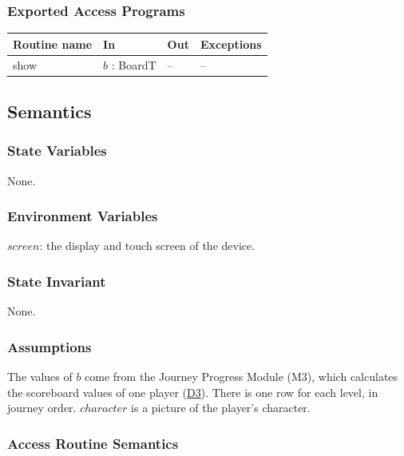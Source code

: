 \documentclass[10pt, titlepage]{article}
\newcommand{\srsurl}{https://team-hindsight.github.io/ophthamology-game/SRS/SRS.pdf}
\newcommand{\srsitemref}[2]{\href{\srsurl\#nameddest=#1}{#2}}
\newcommand{\T}[1]{\mathit{#1}}          %
\newenvironment{accessprogs}{%
  \begin{center}\small
  \begin{tabular}{>{\raggedright\arraybackslash}p{3.0cm}
    >{\raggedright\arraybackslash}p{5.0cm}
    >{\raggedright\arraybackslash}p{2.8cm}
    >{\raggedright\arraybackslash}p{3.4cm}}
  \toprule
  \textbf{Routine name} & \textbf{In} & \textbf{Out} & \textbf{Exceptions}\\
  \midrule}{%
  \bottomrule
  \end{tabular}
  \end{center}}
\begin{document}
\subsubsection{Exported Access Programs}

\begin{accessprogs}
show & $b$ : BoardT & -- & --\\
\end{accessprogs}

\subsection{Semantics}

\subsubsection{State Variables}

None.

\subsubsection{Environment Variables}

$\T{screen}$: the display and touch screen of the device.

\subsubsection{State Invariant}

None.

\subsubsection{Assumptions}

The values of $b$ come from the Journey Progress Module (M3), which calculates
the scoreboard values of one player (\srsitemref{def_Scoreboard}{D3}). There is
one row for each level, in journey order. $\T{character}$ is a picture of the
player's character.

\subsubsection{Access Routine Semantics}
\end{document}
